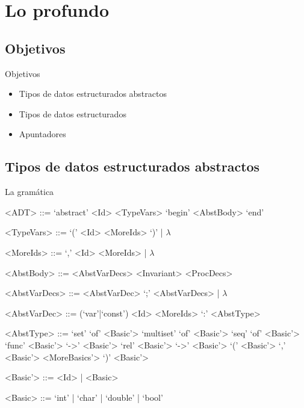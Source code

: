 \section{Lo profundo}
\subsection{Objetivos}
\begin{frame}{Objetivos}
\begin{itemize}
  \item Tipos de datos estructurados abstractos
  \item Tipos de datos estructurados
  \item Apuntadores
\end{itemize}
\end{frame}


\subsection{Tipos de datos estructurados abstractos}
\begin{frame}[fragile]{La gramática}
\scriptsize
\begin{grammar}

<ADT> ::= `abstract' <Id> <TypeVars> `begin' <AbstBody> `end'

<TypeVars> ::= `(' <Id> <MoreIds> `)' | $\lambda$

<MoreIds> ::= `,' <Id> <MoreIds> | $\lambda$

<AbstBody> ::= <AbstVarDecs> <Invariant> <ProcDecs>

<AbstVarDecs> ::= <AbstVarDec> `;' <AbstVarDecs> | $\lambda$

<AbstVarDec> ::= (`var'|`const') <Id> <MoreIds> `:' <AbstType>

<AbstType> ::= `set' `of' <Basic'>
\alt `multiset' `of' <Basic'>
\alt `seq' `of' <Basic'>
\alt `func' <Basic'> `->' <Basic'>
\alt `rel' <Basic'> `->' <Basic'>
\alt `(' <Basic'> `,' <Basic'> <MoreBasics'> `)'
\alt <Basic'>

<Basic'> ::= <Id> | <Basic>

<Basic> ::= `int' | `char' | `double' | `bool'

\end{grammar}
\end{frame}

